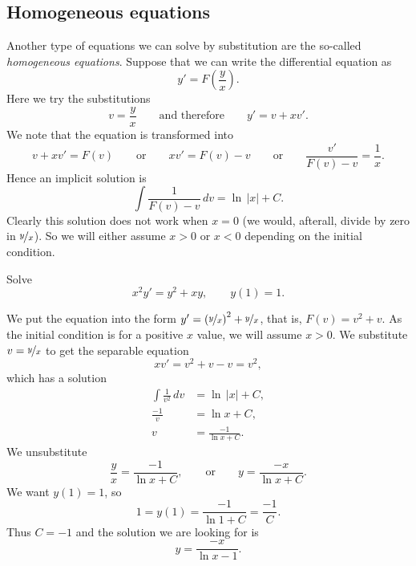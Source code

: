 \subsection{Homogeneous equations}

Another type of equations we can solve by substitution are the 
so-called \emph{homogeneous equations}.
Suppose that we can write the differential equation as
\begin{equation*}
y' = F\left(\frac{y}{x}\right) .
\end{equation*}
Here we try the substitutions
\begin{equation*}
v = \frac{y}{x} \qquad \text{and therefore} \qquad y' = v + x v' .
\end{equation*}
We note that the equation is transformed into
\begin{equation*}
v+ xv' = F(v) \qquad \text{or} \qquad xv' = F(v)-v 
\qquad \text{or} \qquad \frac{v'}{F(v)-v} = \frac{1}{x} .
\end{equation*}
Hence an implicit solution is
\begin{equation*}
\int \frac{1}{F(v)-v} \,dv = \ln \, \lvert x \rvert + C .
\end{equation*}
Clearly this solution does not work when $x = 0$ (we would, afterall,
divide by zero in $\nicefrac{y}{x}$).  So we will either assume $x > 0$
or $x < 0$ depending on the initial condition.

\begin{example}
Solve 
\begin{equation*}
x^2y' = y^2+xy, \qquad y(1)=1.
\end{equation*}

We put the equation into
the form $y'= {\left(\nicefrac{y}{x}\right)}^2+\nicefrac{y}{x}$,
that is, $F(v) = v^2+v$.
As the initial condition is for a positive $x$ value,
we will assume $x > 0$.
We substitute $v=\nicefrac{y}{x}$ to get
the separable equation
\begin{equation*}
xv' = v^2+v-v = v^2 ,
\end{equation*}
which has a solution
\begin{align*}
\int \frac{1}{v^2} \,dv &= \ln \, \lvert x \rvert + C , \\
\frac{-1}{v} &= \ln  x + C , \\
v &= \frac{-1}{\ln  x  + C} .
\end{align*}
We unsubstitute
\begin{equation*}
\frac{y}{x} = \frac{-1}{\ln  x  + C} ,
\qquad
\text{or}
\qquad
y = \frac{-x}{\ln  x  + C} .
\end{equation*}
We want $y(1)=1$, so 
\begin{equation*}
1 = y(1) = \frac{-1}{\ln  1 + C} = \frac{-1}{C} .
\end{equation*}
Thus $C = -1$ and
the solution we are looking for is
\begin{equation*}
y = \frac{-x}{\ln  x  -1} .
\end{equation*}
\end{example}

